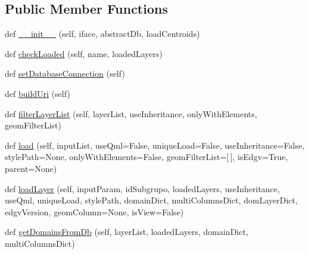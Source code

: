 \subsection*{Public Member Functions}
\begin{DoxyCompactItemize}
\item 
def \mbox{\hyperlink{class_dsg_tools_1_1_factories_1_1_layer_loader_factory_1_1postgis_layer_loader_1_1_post_g_i_s_layer_loader_a4265f4664edae3e55e4d455a084b1c4a}{\+\_\+\+\_\+init\+\_\+\+\_\+}} (self, iface, abstract\+Db, load\+Centroids)
\item 
def \mbox{\hyperlink{class_dsg_tools_1_1_factories_1_1_layer_loader_factory_1_1postgis_layer_loader_1_1_post_g_i_s_layer_loader_a94bf18cb533d9b774d8dd5ea0825fed8}{check\+Loaded}} (self, name, loaded\+Layers)
\item 
def \mbox{\hyperlink{class_dsg_tools_1_1_factories_1_1_layer_loader_factory_1_1postgis_layer_loader_1_1_post_g_i_s_layer_loader_a80eee9b76693f19791b9ff8fa3c4f805}{set\+Database\+Connection}} (self)
\item 
def \mbox{\hyperlink{class_dsg_tools_1_1_factories_1_1_layer_loader_factory_1_1postgis_layer_loader_1_1_post_g_i_s_layer_loader_aa480a36fa57c9daa9b1633eaa8d478ca}{build\+Uri}} (self)
\item 
def \mbox{\hyperlink{class_dsg_tools_1_1_factories_1_1_layer_loader_factory_1_1postgis_layer_loader_1_1_post_g_i_s_layer_loader_a422c789db99e9e2887da74ae63ff7a5e}{filter\+Layer\+List}} (self, layer\+List, use\+Inheritance, only\+With\+Elements, geom\+Filter\+List)
\item 
def \mbox{\hyperlink{class_dsg_tools_1_1_factories_1_1_layer_loader_factory_1_1postgis_layer_loader_1_1_post_g_i_s_layer_loader_a289c140dff1ec163fb9de27e9a14c8c9}{load}} (self, input\+List, use\+Qml=False, unique\+Load=False, use\+Inheritance=False, style\+Path=None, only\+With\+Elements=False, geom\+Filter\+List=\mbox{[}$\,$\mbox{]}, is\+Edgv=True, parent=None)
\item 
def \mbox{\hyperlink{class_dsg_tools_1_1_factories_1_1_layer_loader_factory_1_1postgis_layer_loader_1_1_post_g_i_s_layer_loader_a5203595a972a1a53441b5f6692b3c028}{load\+Layer}} (self, input\+Param, id\+Subgrupo, loaded\+Layers, use\+Inheritance, use\+Qml, unique\+Load, style\+Path, domain\+Dict, multi\+Columns\+Dict, dom\+Layer\+Dict, edgv\+Version, geom\+Column=None, is\+View=False)
\item 
def \mbox{\hyperlink{class_dsg_tools_1_1_factories_1_1_layer_loader_factory_1_1postgis_layer_loader_1_1_post_g_i_s_layer_loader_ae57be9ea3f619b7d90adf6f0c371f8c8}{get\+Domains\+From\+Db}} (self, layer\+List, loaded\+Layers, domain\+Dict, multi\+Columns\+Dict)

\end{DoxyCompactItemize}
